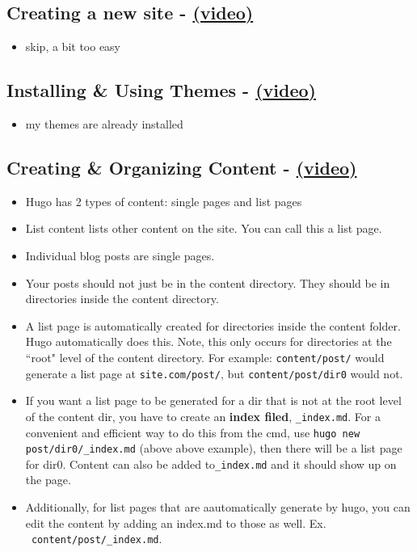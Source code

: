 \subsection{Creating a new site - \href{https://youtu.be/sB0HLHjgQ7E?list=PLLAZ4kZ9dFpOnyRlyS-liKL5ReHDcj4G3}{(video)} }
\begin{itemize}
	\item skip, a bit too easy

\end{itemize}

\subsection{Installing \& Using Themes - \href{https://youtu.be/L34JL_3Jkyc?list=PLLAZ4kZ9dFpOnyRlyS-liKL5ReHDcj4G3}{(video)} }
\begin{itemize}
	\item my themes are already installed
\end{itemize}

\subsection{Creating \& Organizing Content - \href{https://youtu.be/0GZxidrlaRM?list=PLLAZ4kZ9dFpOnyRlyS-liKL5ReHDcj4G3}{(video)} }
\begin{itemize}
	\item
	Hugo has 2 types of content: single pages and list pages
	\item
	List content lists other content on the site. You can call this a list page.
	\item
	Individual blog posts are single pages.
	\item
	Your posts should not just be in the content directory. They should be in directories inside the content directory.
	\item
	A list page is automatically created for directories inside the content folder.  Hugo automatically does this. Note, this only occurs for directories at the ``root" level of the content directory. For example:  \texttt{content/post/} would generate a list page at \texttt{site.com/post/}, but \texttt{content/post/dir0} would not.
	\item
	If you want a list page to be generated for a dir that is not at the root level of the content dir, you have to create an \textbf{index filed}, \texttt{\_index.md}. For a convenient and efficient way to do this from the cmd, use \texttt{hugo new post/dir0/\_index.md} (above above example), then there will be a list page for dir0. 	Content can also be added to\texttt{\_index.md} and it should show up on the page.
	\item
	Additionally, for list pages that are aautomatically generate by hugo, you can edit the content by adding an index.md to those as well. Ex. \texttt{~content/post/\_index.md}.
\end{itemize}

